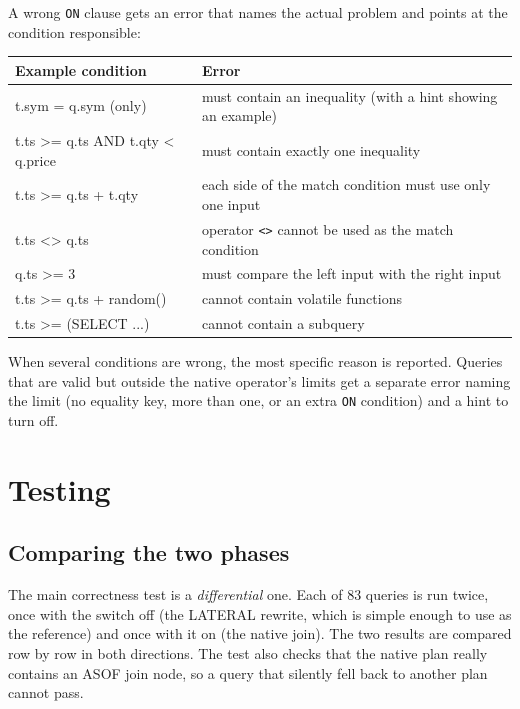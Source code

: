 \documentclass[11pt,a4paper]{article}
\newcommand{\code}[1]{\texttt{#1}}
\begin{document}
A wrong \code{ON} clause gets an error that names the actual problem and points at the
condition responsible:

\begin{center}
\small
\begin{tabular}{@{}>{\ttfamily}p{5.2cm}p{9cm}@{}}
\toprule
\normalfont Example condition & Error \\
\midrule
t.sym = q.sym \textrm{(only)} & must contain an inequality (with a hint showing an example) \\
t.ts >= q.ts AND t.qty < q.price & must contain exactly one inequality \\
t.ts >= q.ts + t.qty & each side of the match condition must use only one input \\
t.ts <> q.ts & operator \code{<>} cannot be used as the match condition \\
q.ts >= 3 & must compare the left input with the right input \\
t.ts >= q.ts + random() & cannot contain volatile functions \\
t.ts >= (SELECT ...) & cannot contain a subquery \\
\bottomrule
\end{tabular}
\end{center}

When several conditions are wrong, the most specific reason is reported. Queries that are
valid but outside the native operator's limits get a separate error naming the limit (no
equality key, more than one, or an extra \code{ON} condition) and a hint to turn
 off.

\section{Testing}

\subsection{Comparing the two phases}

The main correctness test is a \emph{differential} one. Each of 83 queries is run twice,
once with the switch off (the LATERAL rewrite, which is simple enough to use as the
reference) and once with it on (the native join). The two results are compared row by row in both directions. The test also
checks that the native plan really contains an ASOF join node, so a query that silently
fell back to another plan cannot pass.
\end{document}
